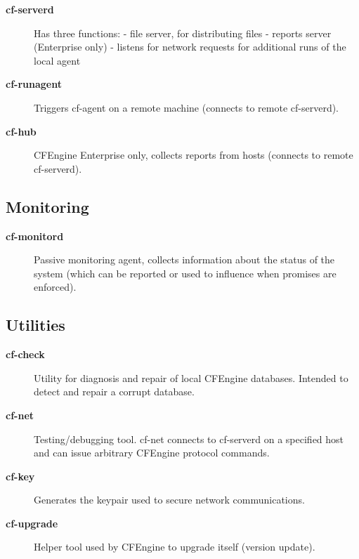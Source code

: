 \begin{description}
\item[\textbf{cf-serverd}] Has three functions:
- file server, for distributing files
- reports server (Enterprise only)
- listens for network requests for additional runs of the local agent



\item[\textbf{cf-runagent}] Triggers cf-agent on a remote machine (connects to remote cf-serverd).



\item[\textbf{cf-hub}] CFEngine Enterprise only, collects reports from hosts (connects to remote cf-serverd).
\end{description}





\subsection{Monitoring}

\begin{description}
\item[\textbf{cf-monitord}] Passive monitoring agent, collects information about the status of the system (which can be reported or used to influence when promises are enforced).
\end{description}





\subsection{Utilities}

\begin{description}
\item[\textbf{cf-check}] Utility for diagnosis and repair of local CFEngine databases. Intended to detect and repair a corrupt database.



\item[\textbf{cf-net}] Testing/debugging tool. cf-net connects to cf-serverd on a specified host and can issue arbitrary CFEngine protocol commands.



\item[\textbf{cf-key}] Generates the keypair used to secure network communications.



\item[\textbf{cf-upgrade}] Helper tool used by CFEngine to upgrade itself (version update).
\end{description}






